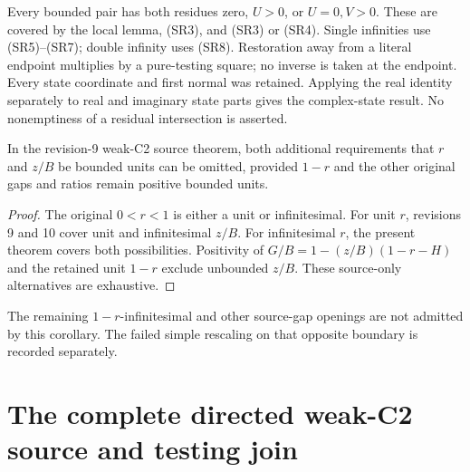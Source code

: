 Every bounded pair has both residues zero, $U>0$, or $U=0,V>0$.
These are covered by the local lemma, (SR3), and (SR3) or (SR4).
Single infinities use (SR5)--(SR7); double infinity uses (SR8).
Restoration away from a literal endpoint multiplies by a pure-testing
square; no inverse is taken at the endpoint. Every state coordinate
and first normal was retained. Applying the real identity separately
to real and imaginary state parts gives the complex-state result.
No nonemptiness of a residual intersection is asserted.

\begin{corollary}
In the revision-9 weak-C2 source theorem, both additional requirements
that $r$ and $z/B$ be bounded units can be omitted, provided $1-r$
and the other original gaps and ratios remain positive bounded units.
\end{corollary}
\begin{proof}
The original $0<r<1$ is either a unit or infinitesimal.
For unit $r$, revisions 9 and 10 cover unit and infinitesimal $z/B$.
For infinitesimal $r$, the present theorem covers both possibilities.
Positivity of $G/B=1-(z/B)(1-r-H)$ and the retained unit $1-r$
exclude unbounded $z/B$. These source-only alternatives are exhaustive.
\end{proof}
The remaining $1-r$-infinitesimal and other source-gap openings
are not admitted by this corollary. The failed simple rescaling on
that opposite boundary is recorded separately.


\section{\texorpdfstring{The complete directed weak-C2 source and testing join}{The complete directed weak-C2 source and testing join}}
\label{component:pec6c617d3a3d}

\label{pec6c617d3a3d:sec:weak-c2-complete-join-rederived}

